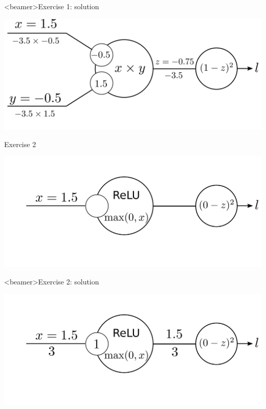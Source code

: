 \documentclass[xcolor=pdftex,dvipsnames,table,mathserif]{beamer}
\begin{document}
\begin{frame}<beamer>{Exercise 1: solution}

  \includegraphics[width=\textwidth]{bp_2_1_neuron_exo_sol.png}

\end{frame}


\begin{frame}{Exercise 2}

  \includegraphics[width=\textwidth]{bp_relu_exo.png}

\end{frame}

\begin{frame}<beamer>{Exercise 2: solution}

  \includegraphics[width=\textwidth]{bp_relu_exo_sol.png}

\end{frame}
\end{document}
